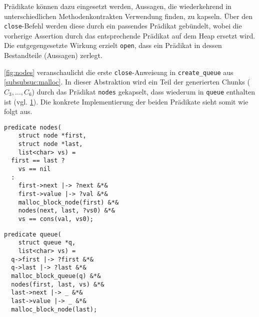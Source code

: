 Prädikate können dazu eingesetzt werden, Aussagen, die wiederkehrend in unterschiedlichen Methodenkontrakten Verwendung finden, zu kapseln. Über den \texttt{close}-Befehl werden diese durch ein passendes Prädikat gebündelt, wobei die vorherige Assertion durch das entsprechende Prädikat auf dem Heap ersetzt wird. Die entgegengesetzte Wirkung erzielt \texttt{open}, dass ein Prädikat in dessen Bestandteile (Aussagen) zerlegt. \cite{Jacobs2008,Jacobs2017}

\begin{figure}[hbt!]
	\begin{minipage}{.45\textwidth}
		
		\label{fig:nodes}
	\end{minipage}
	\hfill
	\begin{minipage}{.45\textwidth}
		
		\label{fig:queue}
	\end{minipage}
\end{figure}

\noindent
\cref{fig:nodes} veranschaulicht die erste \texttt{close}-Anweisung in \texttt{create\_queue} aus \cref{subsubsuc:malloc}. In dieser Abstraktion wird ein Teil der generierten Chunks ($C_{3},\ldots,C_{6}$) durch das Prädikat \texttt{nodes} gekapselt, dass wiederum in \texttt{queue} enthalten ist (vgl. \cref{fig:queue}). Die konkrete Implementierung der beiden Prädikate sieht somit wie folgt aus.

\vspace{-10pt}
{\noindent
\begin{minipage}[t]{.45\textwidth}
\begin{lstlisting}
predicate nodes(
    struct node *first,
    struct node *last,
    list<char> vs) =
  first == last ?
    vs == nil
  :
    first->next |-> ?next &*&
    first->value |-> ?val &*&
    malloc_block_node(first) &*&
    nodes(next, last, ?vs0) &*&
    vs == cons(val, vs0);
\end{lstlisting}
\end{minipage}
\hfill
\begin{minipage}[t]{.45\textwidth}
\begin{lstlisting}
predicate queue(
    struct queue *q,
    list<char> vs) =
  q->first |-> ?first &*&
  q->last |-> ?last &*&
  malloc_block_queue(q) &*&
  nodes(first, last, vs) &*&
  last->next |-> _ &*&
  last->value |-> _ &*&
  malloc_block_node(last);
\end{lstlisting}
\end{minipage}
}

